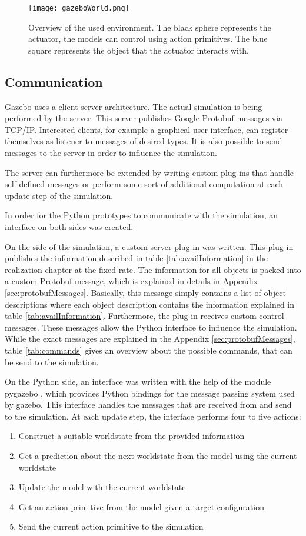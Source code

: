 \begin{figure} 
	\centering
	\texttt{[image: gazeboWorld.png]} 
	\caption{Overview of the used environment. The black sphere represents the actuator, the models can control using action primitives. The blue square represents the object that the actuator interacts with.}
	\label{fig:gazeboWorld}
\end{figure}


\subsection{Communication}
Gazebo uses a client-server architecture. The actual simulation is being performed by the server.
This server publishes Google Protobuf \cite{protobuf} messages via TCP/IP. Interested clients, for example a graphical user interface, can register themselves as listener to messages of desired types. 
It is also possible to send messages to the server in order to influence the simulation. 

The server can furthermore be extended by writing custom plug-ins that handle self defined messages or perform some sort of additional computation at each update step of the simulation. 

In order for the Python prototypes to communicate with the simulation, an interface on both sides was created.

On the side of the simulation, a custom server plug-in was written. This plug-in publishes the information described in table \ref{tab:availInformation} in the realization chapter at the fixed rate. 
The information for all objects is packed into a custom Protobuf message, which is explained in details in Appendix \ref{sec:protobufMessages}. Basically, this message simply contains a list of object descriptions where each object description contains the information explained in table \ref{tab:availInformation}.
Furthermore, the plug-in receives custom control messages. These messages allow the Python interface to influence the simulation.
While the exact messages are explained in the Appendix \ref{sec:protobufMessages}, table \ref{tab:commands} gives an overview about the possible commands, that can be send to the simulation.

On the Python side, an interface was written with the help of the module pygazebo \cite{pygazebo}, which provides Python bindings for the message passing system used by gazebo. This interface handles the messages that are received from and send to the simulation. 
At each update step, the interface performs four to five actions:
\begin{enumerate}
\item Construct a suitable worldstate from the provided information
\item Get a prediction about the next worldstate from the model using the current worldstate
\item Update the model with the current worldstate
\item Get an action primitive from the model given a target configuration
\item Send the current action primitive to the simulation
\end{enumerate}


